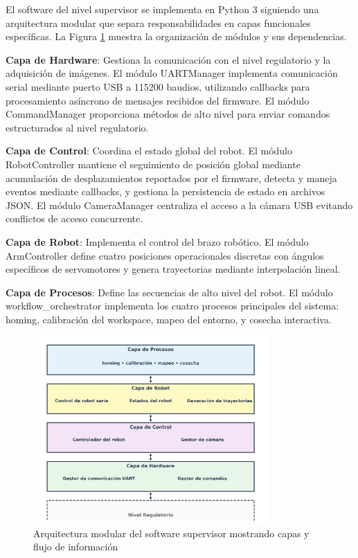 El software del nivel supervisor se implementa en Python 3 siguiendo una arquitectura modular que separa responsabilidades en capas funcionales específicas. La Figura \ref{fig:arquitectura_modulos_supervisor} muestra la organización de módulos y sus dependencias.

\textbf{Capa de Hardware}: Gestiona la comunicación con el nivel regulatorio y la adquisición de imágenes. El módulo UARTManager implementa comunicación serial mediante puerto USB a 115200 baudios, utilizando callbacks para procesamiento asíncrono de mensajes recibidos del firmware. El módulo CommandManager proporciona métodos de alto nivel para enviar comandos estructurados al nivel regulatorio.

\textbf{Capa de Control}: Coordina el estado global del robot. El módulo RobotController mantiene el seguimiento de posición global mediante acumulación de desplazamientos reportados por el firmware, detecta y maneja eventos mediante callbacks, y gestiona la persistencia de estado en archivos JSON. El módulo CameraManager centraliza el acceso a la cámara USB evitando conflictos de acceso concurrente.

\textbf{Capa de Robot}: Implementa el control del brazo robótico. El módulo ArmController define cuatro posiciones operacionales discretas con ángulos específicos de servomotores y genera trayectorias mediante interpolación lineal.

\textbf{Capa de Procesos}: Define las secuencias de alto nivel del robot. El módulo workflow\_orchestrator implementa los cuatro procesos principales del sistema: homing, calibración del workspace, mapeo del entorno, y cosecha interactiva.

\begin{figure}[H]
    \centering
    \includegraphics[width=0.8\textwidth]{imagenes/arquitectura_modulos_supervisor.png}
    \caption{Arquitectura modular del software supervisor mostrando capas y flujo de información}
    \label{fig:arquitectura_modulos_supervisor}
\end{figure}